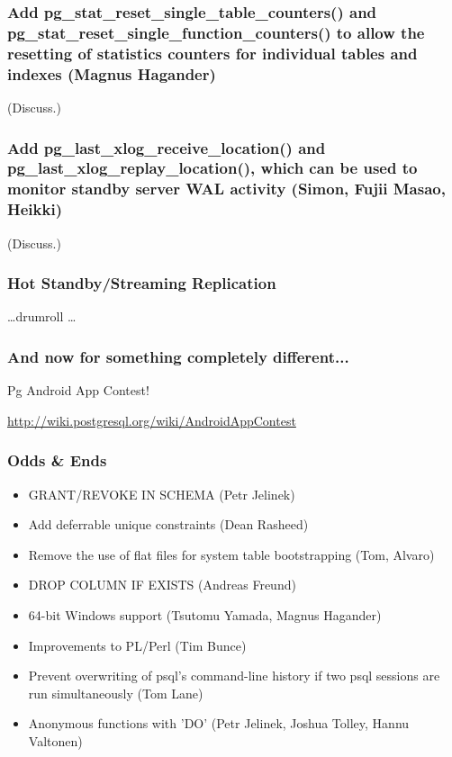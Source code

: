 \documentclass{beamer}
\begin{document}


\frame
{
  \frametitle{Add pg\_stat\_reset\_single\_table\_counters() 
  and pg\_stat\_reset\_single\_function\_counters() 
  to allow the resetting of statistics counters for 
  individual tables and indexes (Magnus Hagander)}

  (Discuss.)
}

\frame
{
  \frametitle{Add pg\_last\_xlog\_receive\_location() 
  and pg\_last\_xlog\_replay\_location(), which can be used to monitor 
  standby server WAL activity (Simon, Fujii Masao, Heikki)}

  (Discuss.)
}

\frame
{
  \frametitle{Hot Standby/Streaming Replication}

  \ldots drumroll \ldots
}

\frame
{
  \frametitle{And now for something completely different...}

  \begin{center}
  Pg Android App Contest!
  \end{center}
  \url{http://wiki.postgresql.org/wiki/AndroidAppContest}
}

\frame
{
  \frametitle{Odds \& Ends}
  \begin{itemize}
  \item[] GRANT/REVOKE IN SCHEMA (Petr Jelinek)
  \item[] Add deferrable unique constraints (Dean Rasheed)
  \item[] Remove the use of flat files for system table bootstrapping (Tom, Alvaro)
  \item[] DROP COLUMN IF EXISTS (Andreas Freund)
  \item[] 64-bit Windows support (Tsutomu Yamada, Magnus Hagander)
  \item[] Improvements to PL/Perl (Tim Bunce)
  \item[] Prevent overwriting of psql's command-line history if two psql sessions are run simultaneously (Tom Lane)
  \item[] Anonymous functions with 'DO' (Petr Jelinek, Joshua Tolley, Hannu Valtonen)
  \end{itemize}
}
\end{document}
